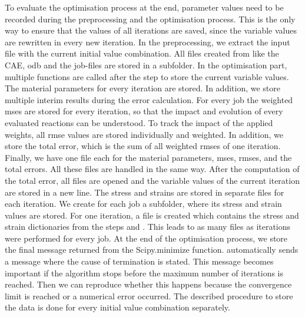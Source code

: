 To evaluate the optimisation process at the end, parameter values need to be recorded during the preprocessing and the optimisation process. This is the only way to ensure that the values of all iterations are saved, since the variable values are rewritten in every new iteration. In the preprocessing, we extract the input file with the current initial value combination. All files created from  like the CAE, \acrshort{odb} and the job-files are stored in a subfolder. In the optimisation part, multiple functions are called after the step  to store the current variable values. The material parameters for every iteration are stored. In addition, we store multiple interim results during the error calculation. For every job the weighted \acrshort{mse}s are stored for every iteration, so that the impact and evolution of every evaluated reactions can be understood. To track the impact of the applied weights, all \acrshort{rmse} values are stored individually and weighted. In addition, we store the total error, which is the sum of all weighted \acrshort{rmse}s of one iteration. Finally, we have one file each for the material parameters, \acrshort{mse}s, \acrshort{rmse}s, and the total errors. All these files are handled in the same way. After the computation of the total error, all files are opened and the variable values of the current iteration are stored in a new line. The stress and strains are stored in separate files for each iteration. We create for each job a subfolder, where its stress and strain values are stored. For one iteration, a file is created which contains the stress and strain dictionaries from the steps  and . This leads to as many files as iterations were performed for every job. At the end of the optimisation process, we store the final message returned from the Scipy.minimize function.  automatically sends a message where the cause of termination is stated. This message becomes important if the algorithm stops before the maximum number of iterations is reached. Then we can reproduce whether this happens because the convergence limit is reached or a numerical error occurred. The described procedure to store the data is done for every initial value combination separately.

